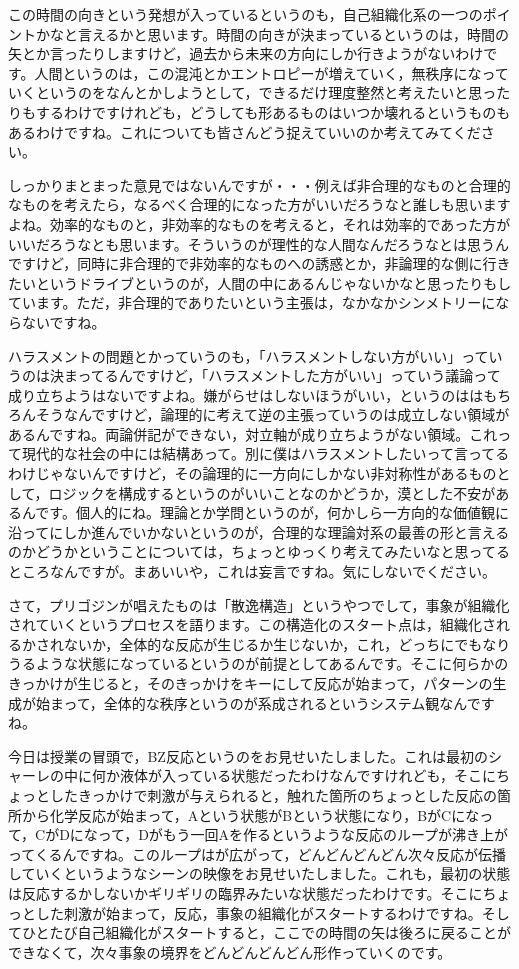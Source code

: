 \documentclass{ltjsbook}
\begin{document}
この時間の向きという発想が入っているというのも，自己組織化系の一つのポイントかなと言えるかと思います。時間の向きが決まっているというのは，時間の矢とか言ったりしますけど，過去から未来の方向にしか行きようがないわけです。人間というのは，この混沌とかエントロピーが増えていく，無秩序になっていくというのをなんとかしようとして，できるだけ理度整然と考えたいと思ったりもするわけですけれども，どうしても形あるものはいつか壊れるというものもあるわけですね。これについても皆さんどう捉えていいのか考えてみてください。

しっかりまとまった意見ではないんですが・・・例えば非合理的なものと合理的なものを考えたら，なるべく合理的になった方がいいだろうなと誰しも思いますよね。効率的なものと，非効率的なものを考えると，それは効率的であった方がいいだろうなとも思います。そういうのが理性的な人間なんだろうなとは思うんですけど，同時に非合理的で非効率的なものへの誘惑とか，非論理的な側に行きたいというドライブというのが，人間の中にあるんじゃないかなと思ったりもしています。ただ，非合理的でありたいという主張は，なかなかシンメトリーにならないですね。

ハラスメントの問題とかっていうのも，「ハラスメントしない方がいい」っていうのは決まってるんですけど，「ハラスメントした方がいい」っていう議論って成り立ちようはないですよね。嫌がらせはしないほうがいい，というのははもちろんそうなんですけど，論理的に考えて逆の主張っていうのは成立しない領域があるんですね。両論併記ができない，対立軸が成り立ちようがない領域。これって現代的な社会の中には結構あって。別に僕はハラスメントしたいって言ってるわけじゃないんですけど，その論理的に一方向にしかない非対称性があるものとして，ロジックを構成するというのがいいことなのかどうか，漠とした不安があるんです。個人的にね。理論とか学問というのが，何かしら一方向的な価値観に沿ってにしか進んでいかないというのが，合理的な理論対系の最善の形と言えるのかどうかということについては，ちょっとゆっくり考えてみたいなと思ってるところなんですが。まあいいや，これは妄言ですね。気にしないでください。


さて，プリゴジンが唱えたものは「散逸構造」というやつでして，事象が組織化されていくというプロセスを語ります。この構造化のスタート点は，組織化されるかされないか，全体的な反応が生じるか生じないか，これ，どっちにでもなりうるような状態になっているというのが前提としてあるんです。そこに何らかのきっかけが生じると，そのきっかけをキーにして反応が始まって，パターンの生成が始まって，全体的な秩序というのが系成されるというシステム観なんですね。

今日は授業の冒頭で，BZ反応というのをお見せいたしました。これは最初のシャーレの中に何か液体が入っている状態だったわけなんですけれども，そこにちょっとしたきっかけで刺激が与えられると，触れた箇所のちょっとした反応の箇所から化学反応が始まって，Aという状態がBという状態になり，BがCになって，CがDになって，Dがもう一回Aを作るというような反応のループが沸き上がってくるんですね。このループはが広がって，どんどんどんどん次々反応が伝播していくというようなシーンの映像をお見せいたしました。これも，最初の状態は反応するかしないかギリギリの臨界みたいな状態だったわけです。そこにちょっとした刺激が始まって，反応，事象の組織化がスタートするわけですね。そしてひとたび自己組織化がスタートすると，ここでの時間の矢は後ろに戻ることができなくて，次々事象の境界をどんどんどんどん形作っていくのです。
\end{document}
